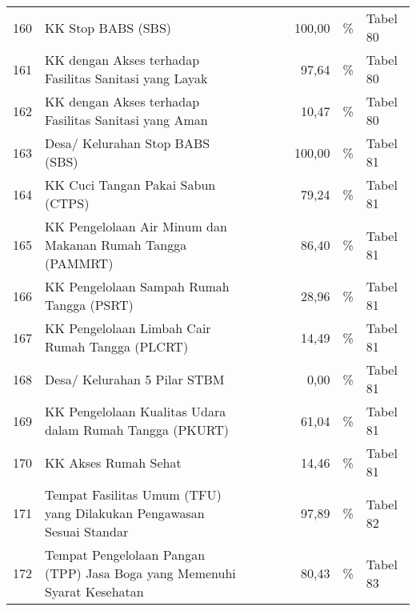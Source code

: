 \begin{small}
\begin{longtable}{rY{12em}rrrrY{5em}Y{5em}}
	160 & KK Stop BABS (SBS)                                                                    &        &        &         &            100,00 & \%                             & Tabel 80 \\
	                  161 & KK dengan Akses terhadap Fasilitas Sanitasi yang Layak                                &        &        &         &             97,64 & \%                             & Tabel 80 \\
	162 & KK dengan Akses terhadap Fasilitas Sanitasi yang Aman                                 &        &        &         &             10,47 & \%                             & Tabel 80 \\
	                  163 & Desa/ Kelurahan Stop BABS (SBS)                                                       &        &        &         &            100,00 & \%                             & Tabel 81 \\
	164 & KK Cuci Tangan Pakai Sabun (CTPS)                                                     &        &        &         &             79,24 & \%                             & Tabel 81 \\
	                  165 & KK Pengelolaan Air Minum dan Makanan Rumah Tangga (PAMMRT)                            &        &        &         &             86,40 & \%                             & Tabel 81 \\
	166 & KK Pengelolaan Sampah Rumah Tangga (PSRT)                                             &        &        &         &             28,96 & \%                             & Tabel 81 \\
	                  167 & KK Pengelolaan Limbah Cair Rumah Tangga (PLCRT)                                       &        &        &         &             14,49 & \%                             & Tabel 81 \\
	168 & Desa/ Kelurahan 5 Pilar STBM                                                          &        &        &         &              0,00 & \%                             & Tabel 81 \\
	                  169 & KK Pengelolaan Kualitas Udara dalam Rumah Tangga (PKURT)                              &        &        &         &             61,04 & \%                             & Tabel 81 \\
	170 & KK Akses Rumah Sehat                                                                  &        &        &         &             14,46 & \%                             & Tabel 81 \\
	                  171 & Tempat Fasilitas Umum (TFU) yang Dilakukan Pengawasan Sesuai Standar                  &        &        &         &             97,89 & \%                             & Tabel 82 \\
	172 & Tempat Pengelolaan Pangan (TPP) Jasa Boga yang Memenuhi Syarat Kesehatan              &        &        &         &             80,43 & \%                             & Tabel 83 \\ 
	 \bottomrule
\end{longtable}%
\end{small}